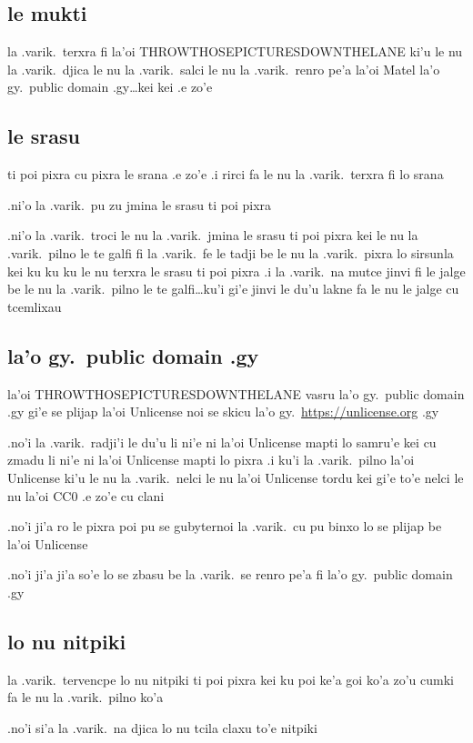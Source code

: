 \documentclass{report}
\begin{document}
\subsection{le mukti}
la .varik.\ terxra fi la'oi THROWTHOSEPICTURESDOWNTHELANE ki'u le nu la .varik.\ djica le nu la .varik.\ salci le nu la .varik.\ renro pe'a la'oi Matel la'o gy.\ public domain .gy\ldots kei kei .e zo'e

\subsection{le srasu}
ti poi pixra cu pixra le srana .e zo'e  .i rirci fa le nu la .varik.\ terxra fi lo srana

.ni'o la .varik.\ pu zu jmina le srasu ti poi pixra

.ni'o la .varik.\ troci le nu la .varik.\ jmina le srasu ti poi pixra kei le nu la .varik.\ pilno le te galfi fi la .varik.\ fe le tadji be le nu la .varik.\ pixra lo sirsunla kei ku ku ku le nu terxra le srasu ti poi pixra  .i la .varik.\ na mutce jinvi fi le jalge be le nu la .varik.\ pilno le te galfi\ldots ku'i gi'e jinvi le du'u lakne fa le nu le jalge cu tcemlixau

\subsection{la'o gy.\ public domain .gy}
la'oi THROWTHOSEPICTURESDOWNTHELANE vasru la'o gy.\ public domain .gy gi'e se plijap la'oi Unlicense noi se skicu la'o gy.\ \url{https://unlicense.org} .gy

.no'i la .varik.\ radji'i le du'u li ni'e ni la'oi Unlicense mapti lo samru'e kei cu zmadu li ni'e ni la'oi Unlicense mapti lo pixra  .i ku'i la .varik.\ pilno la'oi Unlicense ki'u le nu la .varik.\ nelci le nu la'oi Unlicense tordu kei gi'e to'e nelci le nu la'oi CC0 .e zo'e cu clani

.no'i ji'a ro le pixra poi pu se gubyternoi la .varik.\ cu pu binxo lo se plijap be la'oi Unlicense

.no'i ji'a ji'a so'e lo se zbasu be la .varik.\ se renro pe'a fi la'o gy.\ public domain .gy

\subsection{lo nu nitpiki}
la .varik.\ tervencpe lo nu nitpiki ti poi pixra kei ku poi ke'a goi ko'a zo'u cumki fa le nu la .varik.\ pilno ko'a

.no'i si'a la .varik.\ na djica lo nu tcila claxu to'e nitpiki
\end{document}
